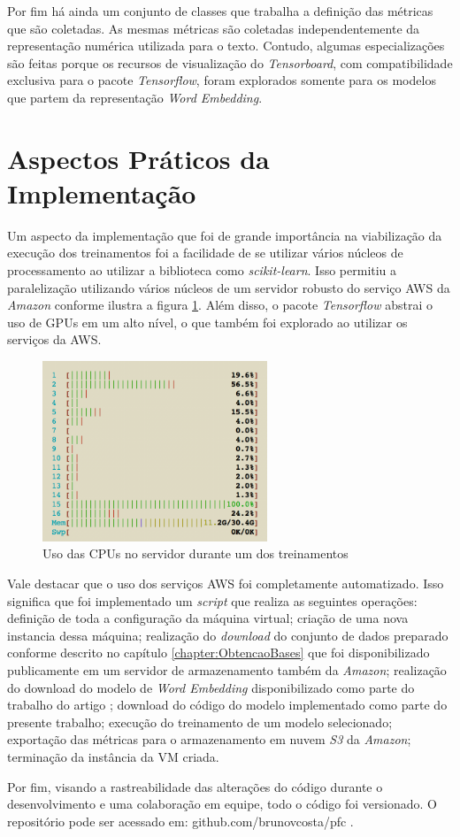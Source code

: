 Por fim há ainda um conjunto de classes que trabalha a definição das métricas que são coletadas. As mesmas métricas são coletadas independentemente da representação numérica utilizada para o texto. Contudo, algumas especializações são feitas porque os recursos de visualização do \textit{Tensorboard}, com compatibilidade exclusiva para o pacote \textit{Tensorflow}, foram explorados somente para os modelos que partem da representação \textit{Word Embedding}.

\section{Aspectos Práticos da Implementação}

Um aspecto da implementação que foi de grande importância na viabilização da execução dos treinamentos foi a facilidade de se utilizar vários núcleos de processamento ao utilizar a biblioteca como \textit{scikit-learn}. Isso permitiu a paralelização utilizando vários núcleos de um servidor robusto do serviço AWS da \textit{Amazon} conforme ilustra a figura \ref{fig:paralelization_AWS}. Além disso, o pacote \textit{Tensorflow} abstrai o uso de GPUs em um alto nível, o que também foi explorado ao utilizar os serviços da AWS.

\begin{figure}[!ht]
	\centering
	\includegraphics[width=0.6\textwidth]{figures/htop.png}
	\caption{Uso das CPUs no servidor durante um dos treinamentos}
	\label{fig:paralelization_AWS}
\end{figure}

Vale destacar que o uso dos serviços AWS foi completamente automatizado. Isso significa que foi implementado um \textit{script} que realiza as seguintes operações: definição de toda a configuração da máquina virtual; criação de uma nova instancia dessa máquina; realização do \textit{download} do conjunto de dados preparado conforme descrito no capítulo \ref{chapter:ObtencaoBases} que foi disponibilizado publicamente em um servidor de armazenamento também da \textit{Amazon}; realização do download do modelo de \textit{Word Embedding} disponibilizado como parte do trabalho do artigo \cite{DBLP:journals/corr/abs-1708-06025}; download do código do modelo implementado como parte do presente trabalho; execução do treinamento de um modelo selecionado; exportação das métricas para o armazenamento em nuvem \textit{S3} da \textit{Amazon}; terminação da instância da VM criada.

Por fim, visando a rastreabilidade das alterações do código durante o desenvolvimento e uma colaboração em equipe, todo o código foi versionado. O repositório pode ser acessado em: github.com/brunovcosta/pfc .
